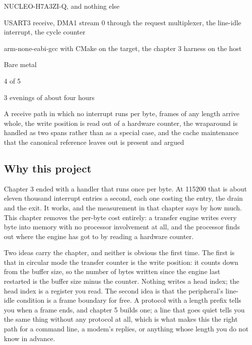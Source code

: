 
\begin{keyfacts}
\item[Board] NUCLEO-H7A3ZI-Q, and nothing else
\item[Peripherals] USART3 receive, DMA1 stream 0 through the request multiplexer, the line-idle interrupt, the cycle counter
\item[Toolchain] arm-none-eabi-gcc with CMake on the target, the chapter 3 harness on the host
\item[Operating system] Bare metal
\item[Difficulty] 4 of 5
\item[Effort] 3 evenings of about four hours
\item[Deliverable] A receive path in which no interrupt runs per byte, frames of any length arrive whole, the write position is read out of a hardware counter, the wraparound is handled as two spans rather than as a special case, and the cache maintenance that the canonical reference leaves out is present and argued
\end{keyfacts}

\subsection*{Why this project}

Chapter 3 ended with a handler that runs once per byte. At 115200 that is about
eleven thousand interrupt entries a second, each one costing the entry, the
drain and the exit. It works, and the measurement in that chapter says by how
much. This chapter removes the per-byte cost entirely: a transfer engine writes
every byte into memory with no processor involvement at all, and the processor
finds out where the engine has got to by reading a hardware counter.

Two ideas carry the chapter, and neither is obvious the first time. The first is
that in circular mode the transfer counter is the write position: it counts down
from the buffer size, so the number of bytes written since the engine last
restarted is the buffer size minus the counter. Nothing writes a head index;
the head index is a register you read. The second idea is that the
peripheral's line-idle condition is a frame boundary for free. A protocol with a
length prefix tells you when a frame ends, and chapter 5 builds one; a line that
goes quiet tells you the same thing without any protocol at all, which is what
makes this the right path for a command line, a modem's replies, or anything
whose length you do not know in advance.

